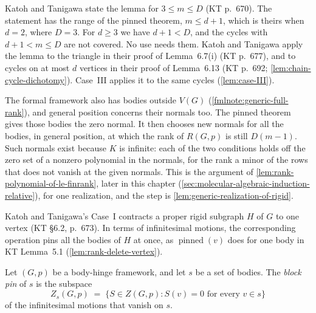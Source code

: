 \begin{fmlnote}
  Katoh and Tanigawa state the lemma for $3 \le m \le D$ (KT p.~670).
  The statement has the range of the pinned theorem, $m \le d + 1$, which
  is theirs when $d = 2$, where $D = 3$. For $d \ge 3$ we have
  $d + 1 < D$, and the cycles with $d + 1 < m \le D$ are not covered. No
  use needs them. Katoh and Tanigawa apply the lemma to the triangle in
  their proof of Lemma~6.7(i) (KT p.~677), and to cycles on at most $d$
  vertices in their proof of Lemma~6.13 (KT p.~692;
  \cref{lem:chain-cycle-dichotomy}). Case~III applies it to the same
  cycles (\cref{lem:case-III}).

  The formal framework also has bodies outside $V(G)$
  (\cref{fmlnote:generic-full-rank}), and general position concerns their
  normals too. The pinned theorem gives those bodies the zero normal.
  It then chooses new normals for all the bodies, in general position, at
  which the rank of $R(G,p)$ is still $D(m - 1)$. Such normals exist
  because $K$ is infinite: each of the two conditions holds off the zero
  set of a nonzero polynomial in the normals, for the rank a minor of
  the rows that does not vanish at the given normals. This is the
  argument of \cref{lem:rank-polynomial-of-le-finrank}, later in this
  chapter (\cref{sec:molecular-algebraic-induction-relative}), for one
  realization, and the step is \cref{lem:generic-realization-of-rigid}.
\end{fmlnote}

Katoh and Tanigawa's Case~I contracts a proper rigid subgraph $H$ of $G$
to one vertex (KT \S6.2, p.~673). In terms of infinitesimal motions, the
corresponding operation pins all the bodies of $H$ at once, as
$\operatorname{pinned}(v)$ does for one body in KT Lemma~5.1
(\cref{lem:rank-delete-vertex}).

\begin{definition}
  \label{def:pinned-motions-on}
  \leanok
  Let $(G,p)$ be a body-hinge framework, and let $s$ be a set of bodies.
  The \emph{block pin} of $s$ is the subspace
  \[
    Z_s(G,p) \;=\; \{S \in Z(G,p) : S(v) = 0 \text{ for every } v \in s\}
  \]
  of the infinitesimal motions that vanish on $s$.
\end{definition}

